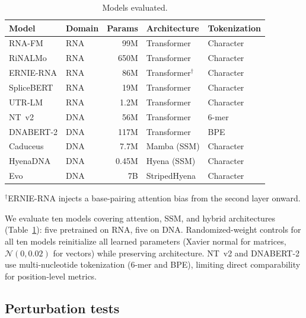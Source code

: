 \documentclass[11pt]{article}
\begin{document}
\begin{table}[htbp]
\centering
\caption{Models evaluated.}
\label{tab:models}
\begin{tabular}{@{}llrll@{}}
\toprule
\textbf{Model} & \textbf{Domain} & \textbf{Params} & \textbf{Architecture} & \textbf{Tokenization} \\
\midrule
RNA-FM \citep{rnafm}                    & RNA & 99M  & Transformer           & Character \\
RiNALMo \citep{rinalmo}                 & RNA & 650M & Transformer           & Character \\
ERNIE-RNA \citep{yin2024ernierna}        & RNA & 86M  & Transformer$^\dagger$ & Character \\
SpliceBERT \citep{chen2024splicebert}     & RNA & 19M  & Transformer           & Character \\
UTR-LM \citep{chu2024utrlm}             & RNA & 1.2M & Transformer           & Character \\
NT~v2 \citep{dalla2023nucleotide}        & DNA & 56M  & Transformer           & 6-mer     \\
DNABERT-2 \citep{zhou2024dnabert2}       & DNA & 117M & Transformer           & BPE       \\
Caduceus \citep{schiff2024caduceus}      & DNA & 7.7M & Mamba (SSM)           & Character \\
HyenaDNA \citep{nguyen2024hyenadna}      & DNA & 0.45M & Hyena (SSM)          & Character \\
Evo \citep{nguyen2024evo}                & DNA & 7B   & StripedHyena          & Character \\
\bottomrule
\end{tabular}
\medskip

\small $^\dagger$ERNIE-RNA injects a base-pairing attention bias from the
second layer onward.
\end{table}

We evaluate ten models covering attention, SSM, and hybrid architectures
(Table~\ref{tab:models}): five pretrained on RNA, five on DNA.
Randomized-weight controls for all ten models reinitialize all
learned parameters (Xavier normal for matrices, $\mathcal{N}(0, 0.02)$
for vectors) while preserving architecture. NT~v2 and DNABERT-2 use
multi-nucleotide tokenization (6-mer and BPE), limiting direct
comparability for position-level metrics.

\subsection{Perturbation tests}
\label{sec:perturbation}
\end{document}
